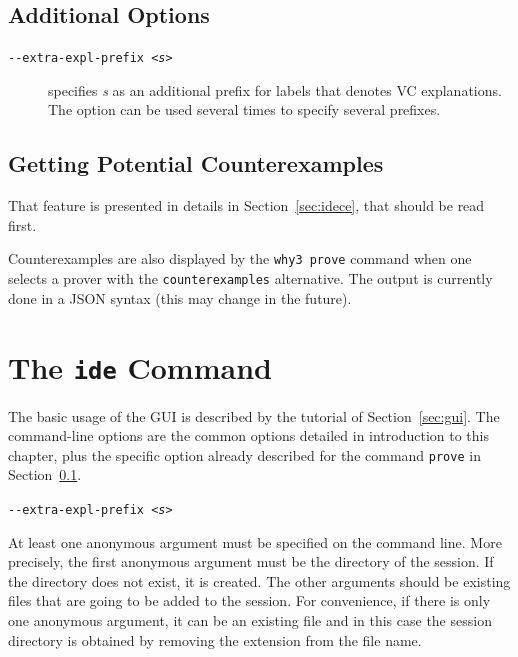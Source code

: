\subsection{Additional Options}
\label{sec:proveoptions}

\begin{description}
\item[\texttt{-{}-extra-expl-prefix \textsl{<s>}}] specifies
  \textsl{s} as an additional prefix for labels that denotes VC
  explanations. The option can be used several times to specify
  several prefixes.
\end{description}

\subsection{Getting Potential Counterexamples}

That feature is presented in details in Section~\ref{sec:idece}, that should be read first.

Counterexamples are also displayed by the \texttt{why3 prove} command
when one selects a prover with the \texttt{counterexamples}
alternative. The output is currently done in a JSON syntax (this may change in the future).



\section{The \texttt{ide} Command}
\label{sec:ideref}

The basic usage of the GUI is described by the tutorial of
Section~\ref{sec:gui}. The command-line options are the common options
detailed in introduction to this chapter, plus the specific option
already described for the command \texttt{prove} in
Section~\ref{sec:proveoptions}.
\begin{description}
\item[\texttt{-{}-extra-expl-prefix \textsl{<s>}}]
\end{description}
At least one anonymous argument must be specified on the command
line. More precisely, the first anonymous argument must be the
directory of the session. If the directory does not exist, it is
created. The other arguments should be existing files that are going
to be added to the session. For convenience, if there is only one
anonymous argument, it can be an existing file and in this case the
session directory is obtained by removing the extension from the file
name.

